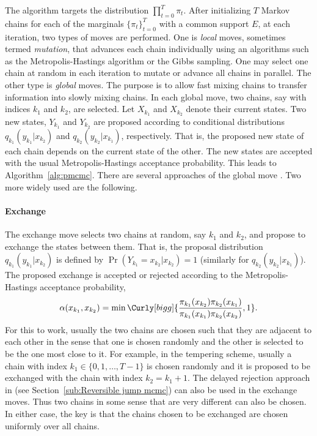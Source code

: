 The algorithm targets the distribution $\prod_{t=0}^T\pi_t$. After initializing $T$ Markov chains for each of the marginals $\{\pi_t\}_{t=0}^T$ with a common support $E$, at each iteration, two types of moves are performed. One is \emph{local} moves, sometimes termed \emph{mutation}, that advances each chain individually using an \mcmc algorithms such as the Metropolis-Hastings algorithm or the Gibbs sampling. One may select one chain at random in each iteration to mutate or advance all chains in parallel. The other type is \emph{global} moves. The purpose is to allow fast mixing chains to transfer information into slowly mixing chains. In each global move, two chains, say with indices $k_1$ and $k_2$, are selected. Let $X_{k_1}$ and $X_{k_2}$ denote their current states. Two new states, $Y_{k_1}$ and $Y_{k_2}$ are proposed according to conditional distributions $q_{k_1}(y_{k_1}|x_{k_2})$ and $q_{k_2}(y_{k_2}|x_{k_1})$, respectively. That is, the proposed new state of each chain depends on the current state of the other. The new states are accepted with the usual Metropolis-Hastings acceptance probability. This leads to Algorithm~\ref{alg:pmcmc}. There are several approaches of the global move \cite{Jasra:2007in}. Two more widely used are the following.



\paragraph{Exchange}

The exchange move selects two chains at random, say $k_1$ and $k_2$, and propose to exchange the states between them. That is, the proposal distribution $q_{k_1}(y_{k_1}|x_{k_2})$ is defined by $\Pr(Y_{k_1}=x_{k_2}|x_{k_2}) = 1$ (similarly for $q_{k_2}(y_{k_2}|x_{k_1})$). The proposed exchange is accepted or rejected according to the Metropolis-Hastings acceptance probability,
\begin{equation}
  \alpha(x_{k_1}, x_{k_2}) =
  \min\Curly[bigg]{
  \frac{\pi_{k_1}(x_{k_2})\pi_{k_2}(x_{k_1})}
  {\pi_{k_1}(x_{k_1})\pi_{k_2}(x_{k_2})}, 1}.
  \label{eq:exchange accept}
\end{equation}
For this to work, usually the two chains are chosen such that they are adjacent to each other in the sense that one is chosen randomly and the other is selected to be the one most close to it. For example, in the tempering scheme, usually a chain with index $k_1 \in\{0,1,\dots,T-1\}$ is chosen randomly and it is proposed to be exchanged with the chain with index $k_2 = k_1 + 1$. The delayed rejection approach in \cite{Green:2001tk} (see Section~\ref{sub:Reversible jump mcmc}) can also be used in the exchange moves. Thus two chains in some sense that are very different can also be chosen. In either case, the key is that the chains chosen to be exchanged are chosen uniformly over all chains.

